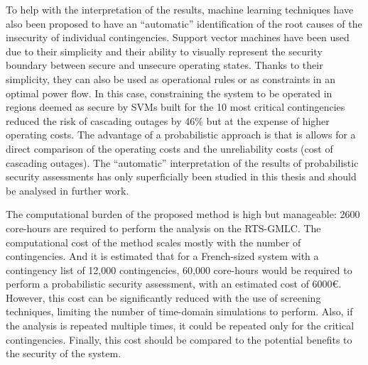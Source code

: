 To help with the interpretation of the results, machine learning techniques have also been proposed to have an ``automatic'' identification of the root causes of the insecurity of individual contingencies. Support vector machines have been used due to their simplicity and their ability to visually represent the security boundary between secure and unsecure operating states. Thanks to their simplicity, they can also be used as operational rules or as constraints in an optimal power flow. In this case, constraining the system to be operated in regions deemed as secure by SVMs built for the 10 most critical contingencies reduced the risk of cascading outages by 46\% but at the expense of higher operating costs. The advantage of a probabilistic approach is that is allows for a direct comparison of the operating costs and the unreliability costs (\ie cost of cascading outages). The ``automatic'' interpretation of the results of probabilistic security assessments has only superficially been studied in this thesis and should be analysed in further work.

The computational burden of the proposed method is high but manageable: 2600 core-hours are required to perform the analysis on the RTS-GMLC. The computational cost of the method scales mostly with the number of contingencies. And it is estimated that for a French-sized system with a contingency list of 12,000 contingencies, 60,000 core-hours would be required to perform a probabilistic security assessment, with an estimated cost of 6000€. However, this cost can be significantly reduced with the use of screening techniques, limiting the number of time-domain simulations to perform. Also, if the analysis is repeated multiple times, it could be repeated only for the critical contingencies. Finally, this cost should be compared to the potential benefits to the security of the system.
